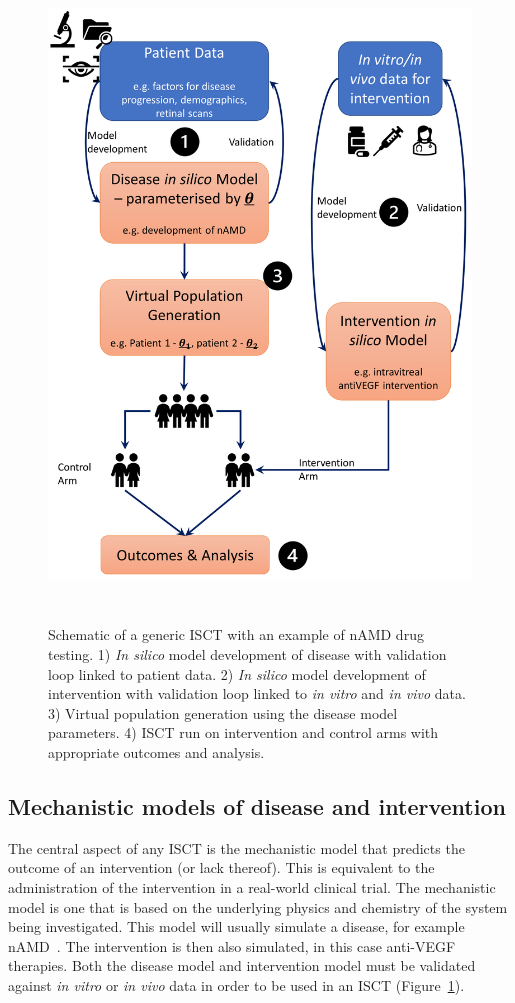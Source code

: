 \documentclass{article}
\begin{document}
\begin{figure}[t!]
  \centering
  \includegraphics[width=.8\textwidth, height=17.3cm]{Fig_sec_8.png}
  \hfill
  \caption{Schematic of a generic ISCT with an example of nAMD drug testing. 1) \textit{In silico} model development of disease with validation loop linked to patient data. 2) \textit{In silico} model development of intervention with validation loop linked to \textit{in vitro} and \textit{in vivo} data. 3) Virtual population generation using the disease model parameters. 4) ISCT run on intervention and control arms with appropriate outcomes and analysis.}
  \label{fig:ISCT}
\end{figure}

\subsection{Mechanistic models of disease and intervention}\label{sec:InSilicoTrials_ModelOfDiseaseAndIntervention}

The central aspect of any ISCT is the mechanistic model that predicts the outcome of an intervention (or lack thereof). 
This is equivalent to the administration of the intervention in a real-world clinical trial. 
The mechanistic model is one that is based on the underlying physics and chemistry of the system being investigated. 
This model will usually simulate a disease, for example nAMD~\cite{Hoyle_2017}. 
The intervention is then also simulated, in this case anti-VEGF therapies. 
Both the disease model and intervention model must be validated against \textit{in vitro} or \textit{in vivo} data in order to be used in an ISCT (Figure~\ref{fig:ISCT}).
\end{document}
